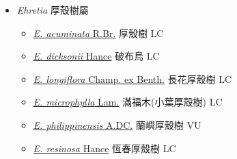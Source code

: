 
  \begin{itemize}
 \item[] \textit{Ehretia} 厚殼樹屬
                    
  \begin{itemize}
        \item[] \href{http://www.theplantlist.org/tpl1.1/search?q=Ehretia+acuminata}{\textit{E. acuminata} R.Br.}   厚殼樹 LC
        \item[] \href{http://www.theplantlist.org/tpl1.1/search?q=Ehretia+dicksonii}{\textit{E. dicksonii} Hance}   破布烏 LC
        \item[] \href{http://www.theplantlist.org/tpl1.1/search?q=Ehretia+longiflora}{\textit{E. longiflora} Champ. ex Benth.}   長花厚殼樹 LC
        \item[] \href{http://www.theplantlist.org/tpl1.1/search?q=Ehretia+microphylla}{\textit{E. microphylla} Lam.}     滿福木(小葉厚殼樹)   LC
        \item[] \href{http://www.theplantlist.org/tpl1.1/search?q=Ehretia+philippinensis}{\textit{E. philippinensis} A.DC.}   蘭嶼厚殼樹 VU
        \item[] \href{http://www.theplantlist.org/tpl1.1/search?q=Ehretia+resinosa}{\textit{E. resinosa} Hance}   恆春厚殼樹 LC
  \end{itemize}
  \end{itemize}
